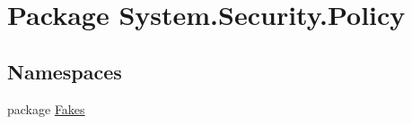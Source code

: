 \hypertarget{namespace_system_1_1_security_1_1_policy}{\section{Package System.\-Security.\-Policy}
\label{namespace_system_1_1_security_1_1_policy}
}
\subsection*{Namespaces}
\begin{DoxyCompactItemize}
\item 
package \hyperlink{namespace_system_1_1_security_1_1_policy_1_1_fakes}{Fakes}
\end{DoxyCompactItemize}
